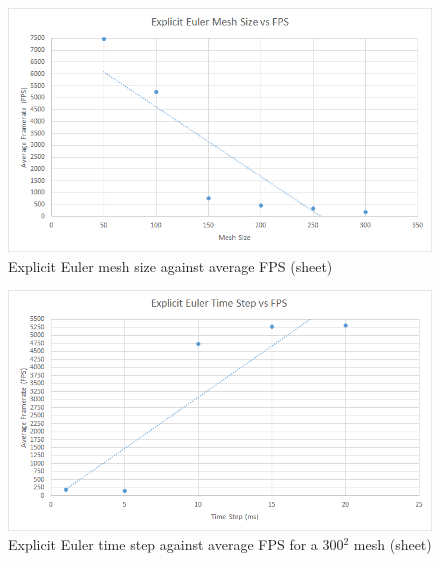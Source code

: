     \begin{figure}
    \begin{center}
      \includegraphics[scale=.9]{Figures/sheet_ee_m_fps}
    \end{center}
    \caption{Explicit Euler mesh size against average FPS (sheet)}
    \label{fig:ee mesh fps sheet}
  \end{figure}
  
    \begin{figure}
    \begin{center}
      \includegraphics[scale=.9]{Figures/sheet_ee_ts_fps}
    \end{center}
    \caption{Explicit Euler time step against average FPS for a 300$^{2}$ mesh (sheet)}
    \label{fig:ee step fps sheet}
  \end{figure}
  
